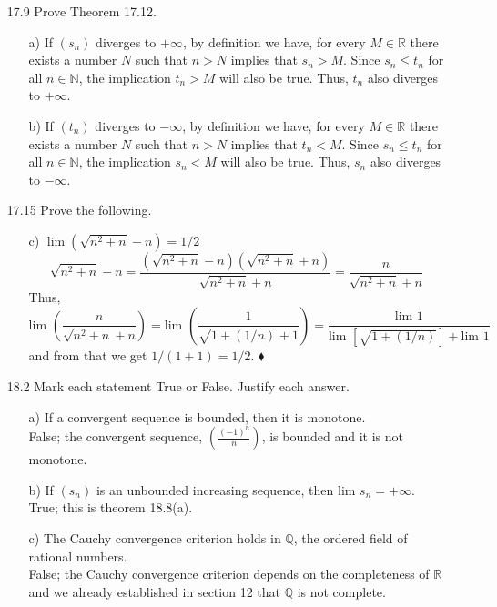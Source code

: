 \documentclass[12pt]{article}
\begin{document}
\begin{enumerate}
\item[17.9] Prove Theorem 17.12.
\begin{enumerate}
\item[a)] If $(s_n)$ diverges to $+\infty$, by definition we have, 
for every $M \in \mathbb{R}$ there exists a number $N$ such that
$n > N$ implies that $s_n > M$. Since $s_n \leq t_n$ for all $n \in \mathbb{N}$, 
the implication $t_n > M$ will also be true. Thus, $t_n$ also diverges to
$+\infty$.
\item[b)] If $(t_n)$ diverges to $-\infty$, by definition we have, 
for every $M \in \mathbb{R}$ there exists a number $N$ such that
$n > N$ implies that $t_n < M$. Since $s_n \leq t_n$ for all $n \in \mathbb{N}$, 
the implication $s_n < M$ will also be true. Thus, $s_n$ also diverges to
$-\infty$.
\end{enumerate}

\item[17.15] Prove the following.
\begin{enumerate}
\item[c)] $\lim (\sqrt{n^2 + n} - n) = 1/2$
\[
\sqrt{n^2 + n} - n = \frac{(\sqrt{n^2 + n} - n)(\sqrt{n^2 + n} + n)}{\sqrt{n^2 + n} + n}
= \frac{n}{\sqrt{n^2 + n} + n}
\]
Thus,
\[
\mbox{lim }\left( \frac{n}{\sqrt{n^2 + n} + n} \right) = 
\mbox{lim }\left( \frac{1}{\sqrt{1 + (1/n)} + 1} \right) =
\frac{\mbox{lim }1}{\mbox{lim } [\sqrt{1 + (1/n)}] + \mbox{lim } 1}
\]
and from that we get $1/(1 + 1) = 1/2$. \hskip 7.2cm $\blacklozenge$ 
\end{enumerate}

\item[18.2] Mark each statement True or False. Justify each answer.
\begin{enumerate}
\item[a)] If a convergent sequence is bounded, then it is monotone. \\
False; the convergent sequence, {\large $\left( \frac{(-1)^n}{n} \right)$},
is bounded and it is not monotone.
\item[b)] If $(s_n)$ is an unbounded increasing sequence, then lim $s_n = +\infty$. \\
True; this is theorem 18.8(a).
\item[c)] The Cauchy convergence criterion holds in $\mathbb{Q}$, the ordered field of rational numbers. \\
False; the Cauchy convergence criterion depends on the completeness of $\mathbb{R}$
and we already established in section 12 that $\mathbb{Q}$ is not complete.
\end{enumerate}


\end{enumerate}
\end{document}
